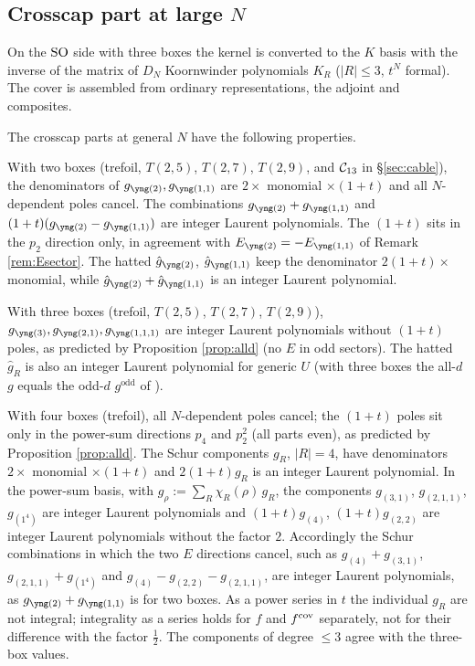 \subsection{Crosscap part at large $N$}
On the $\mathrm{SO}$ side with three boxes the kernel is converted to the $K$ basis with the inverse of the matrix of $D_N$ Koornwinder polynomials $K_R$ ($|R| \le 3$, $t^N$ formal). The cover is assembled from ordinary representations, the adjoint and composites.
\begin{result}\label{cr:largeN}
The crosscap parts at general $N$ have the following properties.

With two boxes (trefoil, $T(2,5)$, $T(2,7)$, $T(2,9)$, and $\mathcal{C}_{13}$ in \S\ref{sec:cable}), the denominators of $g_{\ytwo}, g_{\yoneone}$ are $2\times$ monomial $\times(1+t)$ and all $N$-dependent poles cancel. The combinations $g_{\ytwo} + g_{\yoneone}$ and $(1+t)(g_{\ytwo} - g_{\yoneone})$ are integer Laurent polynomials. The $(1+t)$ sits in the $p_2$ direction only, in agreement with $E_{\ytwo} = -E_{\yoneone}$ of Remark \ref{rem:Esector}. The hatted $\hat g_{\ytwo}$, $\hat g_{\yoneone}$ keep the denominator $2(1+t)\times$ monomial, while $\hat g_{\ytwo} + \hat g_{\yoneone}$ is an integer Laurent polynomial.

With three boxes (trefoil, $T(2,5)$, $T(2,7)$, $T(2,9)$), $g_{\ythree}, g_{\ytwoone}, g_{\yoneoneone}$ are integer Laurent polynomials without $(1+t)$ poles, as predicted by Proposition \ref{prop:alld} (no $E$ in odd sectors). The hatted $\hat g_R$ is also an integer Laurent polynomial for generic $U$ (with three boxes the all-$d$ $g$ equals the odd-$d$ $g^{\mathrm{odd}}$ of \cite{Marino09}).

With four boxes (trefoil), all $N$-dependent poles cancel; the $(1+t)$ poles sit only in the power-sum directions $p_4$ and $p_2^2$ (all parts even), as predicted by Proposition \ref{prop:alld}. The Schur components $g_R$, $|R| = 4$, have denominators $2\times$ monomial $\times(1+t)$ and $2(1+t)g_R$ is an integer Laurent polynomial. In the power-sum basis, with $g_\rho := \sum_R \chi_R(\rho)\,g_R$, the components $g_{(3,1)}$, $g_{(2,1,1)}$, $g_{(1^4)}$ are integer Laurent polynomials and $(1+t)g_{(4)}$, $(1+t)g_{(2,2)}$ are integer Laurent polynomials without the factor $2$. Accordingly the Schur combinations in which the two $E$ directions cancel, such as $g_{(4)} + g_{(3,1)}$, $g_{(2,1,1)} + g_{(1^4)}$ and $g_{(4)} - g_{(2,2)} - g_{(2,1,1)}$, are integer Laurent polynomials, as $g_{\ytwo} + g_{\yoneone}$ is for two boxes. As a power series in $t$ the individual $g_R$ are not integral; integrality as a series holds for $f$ and $f^{\mathrm{cov}}$ separately, not for their difference with the factor $\tfrac12$. The components of degree $\le 3$ agree with the three-box values.


\end{result}
